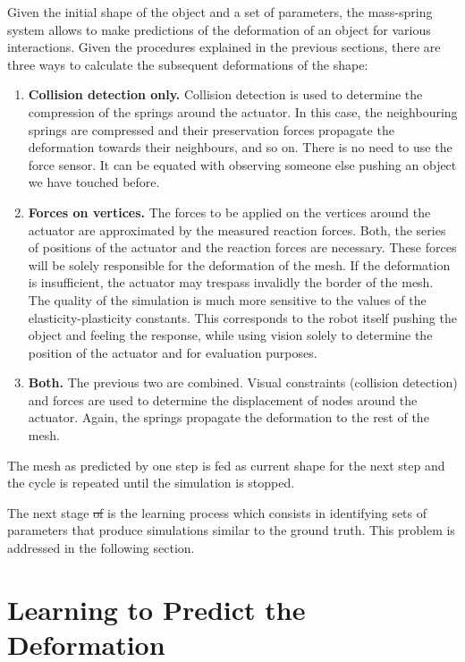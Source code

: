 \documentclass[journal]{IEEEtran}
\newcommand{\comment}[1]{{\color{red} #1}}
\newcommand{\commentErrase}[1]{\comment{\sout{#1}}}
\begin{document}
Given the initial shape of the object and a set of parameters, the mass-spring system allows to make predictions of the deformation of an object for various interactions.  Given the procedures explained in the previous sections, there are three ways to calculate the subsequent deformations of the shape:
\begin{enumerate}
 \item \textbf{Collision detection only.} Collision detection is used to determine the compression of the springs around the actuator.  In this case, the neighbouring springs are compressed and their preservation forces propagate the deformation towards their neighbours, and so on.  There is no need to use the force sensor.  It can be equated with observing someone else pushing an object we have touched before.
 \item \textbf{Forces on vertices.} The forces to be applied on the  vertices around the actuator are approximated by the measured reaction forces.  Both, the series of positions of the actuator and the reaction forces are necessary.  These forces will be solely responsible for the deformation of the mesh.  If the deformation is insufficient, the actuator may trespass invalidly the border of the mesh.  The quality of the simulation is much more sensitive to the values of the elasticity-plasticity constants.  This corresponds to the robot itself pushing the object and feeling the response, while using vision solely to determine the position of the actuator and for evaluation purposes.
 \item \textbf{Both.} The previous two are combined.  Visual constraints (collision detection) and forces are used to determine the displacement of nodes around the actuator.  Again, the springs propagate the deformation to the rest of the mesh.
\end{enumerate}
The mesh as predicted by one step is fed as current shape for the next step and the cycle is repeated until the simulation is stopped.

The next stage \commentErrase{of} \comment{is} the learning process \comment{which} consists in identifying sets of parameters that produce simulations similar to the ground truth.  This problem is addressed in the following section.


\section{Learning to Predict the Deformation}
\label{sec:learning}
\end{document}
